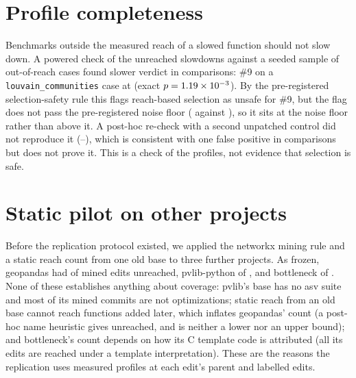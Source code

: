 \section{Profile completeness}
\label{app:completeness}
Benchmarks outside the measured reach of a slowed function should not slow down.
A powered check of the \SlowMissedUnreached{} unreached slowdowns against a seeded sample of out-of-reach cases found \CompletenessSlower{} slower verdict in \CompletenessN{} comparisons: \#9 on a \texttt{louvain\_communities} case at \SlowNineRatio\x{} (exact $p=1.19\times10^{-3}$).
By the pre-registered selection-safety rule this flags reach-based selection as unsafe for \#9, but the flag does not pass the pre-registered noise floor (\SlowNineRatio\x{} against \FloorNine), so it sits at the noise floor rather than above it.
A post-hoc re-check with a second unpatched control did not reproduce it (\SlowNineRecheckLo--\SlowNineRecheckHi\x), which is consistent with one false positive in \CompletenessN{} comparisons but does not prove it.
This is a check of the profiles, not evidence that selection is safe.

\section{Static pilot on other projects}
\label{app:q3}
Before the replication protocol existed, we applied the networkx mining rule and a static reach count from one old base to three further projects.
As frozen, geopandas had \QThreeGeo{} of \QThreeGeoN{} mined edits unreached, pvlib-python \QThreePv{} of \QThreePv{}, and bottleneck \QThreeBn{} of \BnEdits.
None of these establishes anything about coverage: pvlib's base has no asv suite and most of its mined commits are not optimizations; static reach from an old base cannot reach functions added later, which inflates geopandas' count (a post-hoc name heuristic gives \QThreeGeoHeur{} unreached, and is neither a lower nor an upper bound); and bottleneck's count depends on how its C template code is attributed (all its edits are reached under a template interpretation).
These are the reasons the replication uses measured profiles at each edit's parent and labelled edits.

